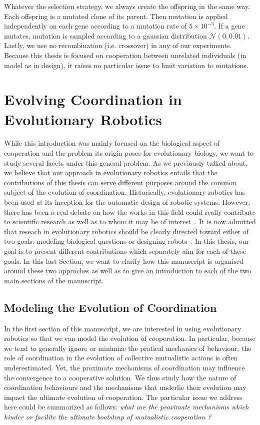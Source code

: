 
    Whatever the selection strategy, we always create the offspring in the same way. Each offspring is a mutated clone of its parent. Then mutation is applied independently on each gene according to a mutation rate of \(5 \times 10^{-3}\). If a gene mutates, mutation is sampled according to a gaussian distribution \(\mathcal{N}(0, 0.01)\). Lastly, we use no recombination (i.e. crossover) in any of our experiments. Because this thesis is focused on cooperation between unrelated individuals (in model as in design), it raises no particular issue to limit variation to mutations.


\section{Evolving Coordination in Evolutionary Robotics}

  While this introduction was mainly focused on the biological aspect of cooperation and the problem its origin poses for evolutionary biology, we want to study several facets under this general problem. As we previously talked about, we believe that our approach in evolutionary robotics entails that the contributions of this thesis can serve different purposes around the common subject of the evolution of coordination. Historically, evolutionary robotics has been used at its inception for the automatic design of robotic systems. However, there has been a real debate on how the works in this field could really contribute to scientific research as well as to whom it may be of interest~\parencite{Trianni2014b, Doncieux2015a}. It is now admitted that reseach in evolutionary robotics should be clearly directed toward either of two goals: modeling biological questions or designing robots~\parencite{Trianni2014b}. In this thesis, our goal is to present different contributions which separately aim for each of these goals. In this last Section, we want to clarify how this manuscript is organised around these two approches as well as to give an introduction to each of the two main sections of the manuscript.
  
  \subsection{Modeling the Evolution of Coordination}

    In the first section of this manuscript, we are interested in using evolutionary robotics so that we can model the evolution of cooperation. In particular, because we tend to generally ignore or minimize the pratical mechanics of behaviour, the role of coordination in the evolution of collective mutualistic actions is often underestimated. Yet, the proximate mechanisms of coordination may influence the convergence to a cooperative solution. We thus study how the nature of coordination behaviours and the mechanisms that underlie their evolution may impact the ultimate evolution of cooperation. The particular issue we address here could be summarized as follows: \emph{what are the proximate mechanisms which hinder or facilite the ultimate bootstrap of mutualistic cooperation ?}

